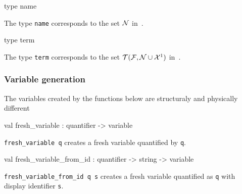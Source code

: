 \label{type:Term.name}\begin{ocamldoccode}
type name 
\end{ocamldoccode}
\begin{ocamldocdescription}
The type {\tt{name}} corresponds to the set $\mathcal{N}$ in~\thesis. 


\end{ocamldocdescription}




\label{type:Term.term}\begin{ocamldoccode}
type term 
\end{ocamldoccode}
\begin{ocamldocdescription}
The type {\tt{term}} corresponds to the set $\mathcal{T}(\mathcal{F},\mathcal{N} \cup \mathcal{X}^1)$ in~\thesis. 


\end{ocamldocdescription}




\subsubsection{Variable generation}




The variables created by the functions below are structuraly and physically different



\label{val:Term.fresh-underscorevariable}\begin{ocamldoccode}
val fresh_variable : quantifier -> variable
\end{ocamldoccode}
\begin{ocamldocdescription}
{\tt{fresh\_variable q}} creates a fresh variable quantified by {\tt{q}}.


\end{ocamldocdescription}




\label{val:Term.fresh-underscorevariable-underscorefrom-underscoreid}\begin{ocamldoccode}
val fresh_variable_from_id : quantifier -> string -> variable
\end{ocamldoccode}
\begin{ocamldocdescription}
{\tt{fresh\_variable\_from\_id q s}} creates a fresh variable quantified as {\tt{q}} with display identifier {\tt{s}}.


\end{ocamldocdescription}




